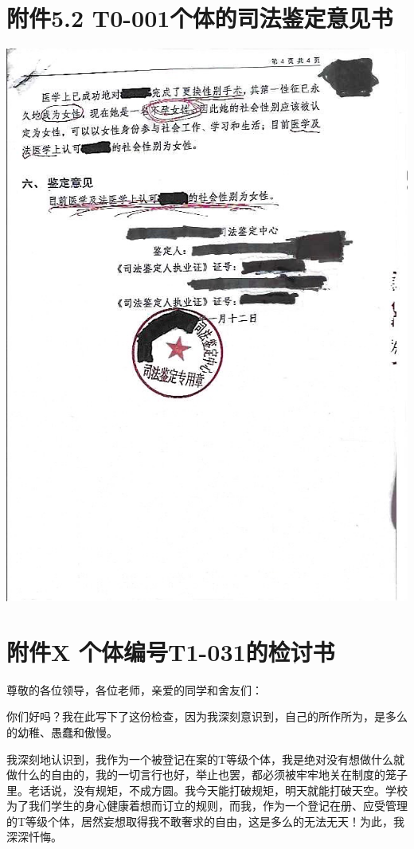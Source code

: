 \documentclass[]{ctexrep}
\begin{document}
	\section*{附件5.2 T0-001个体的司法鉴定意见书}
	\label{附件5.2}
	\includegraphics[scale=0.6]{./附件5.2.png}
	
	\newpage
	\section*{附件X 个体编号T1-031的检讨书}
	
	\noindent 尊敬的各位领导，各位老师，亲爱的同学和舍友们：
	
	你们好吗？我在此写下了这份检查，因为我深刻意识到，自己的所作所为，是多么的幼稚、愚蠢和傲慢。
	
	我深刻地认识到，我作为一个被登记在案的T等级个体，我是绝对没有想做什么就做什么的自由的，我的一切言行也好，举止也罢，都必须被牢牢地关在制度的笼子里。老话说，没有规矩，不成方圆。我今天能打破规矩，明天就能打破天空。学校为了我们学生的身心健康着想而订立的规则，而我，作为一个登记在册、应受管理的T等级个体，居然妄想取得我不敢奢求的自由，这是多么的无法无天！为此，我深深忏悔。
	
\end{document}
